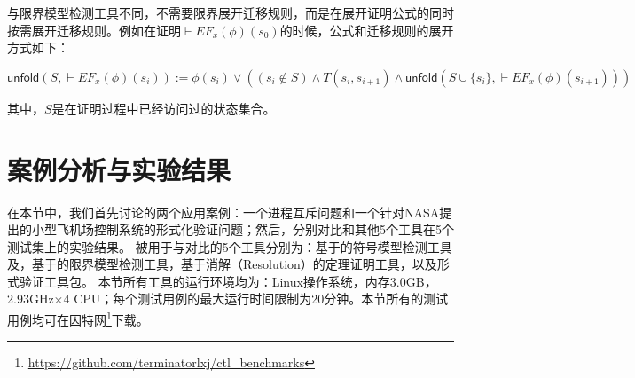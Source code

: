 与限界模型检测工具不同，\sctlprov{}不需要限界展开迁移规则，而是在展开证明公式的同时按需展开迁移规则。例如在证明$\vdash EF_x(\phi)(s_0)$的时候，公式和迁移规则的展开方式如下：

\begin{center}{\small
		$
		\textsf{unfold}(S,\vdash EF_x(\phi)(s_i)) := 
		\phi(s_i) \vee ((s_i\notin S) \wedge T(s_i, s_{i+1}) \wedge 
		\textsf{unfold}(S\cup \{s_i\},\vdash EF_x(\phi)(s_{i+1})))
		$
	}
\end{center}
其中，$S$是在证明过程中已经访问过的状态集合。




\section{案例分析与实验结果}\label{sec:case_exp}

在本节中，我们首先讨论\sctlprov{}的两个应用案例：一个进程互斥问题和一个针对NASA提出的小型飞机场控制系统的形式化验证问题；然后，分别对比\sctlprov{}和其他5个工具在5个测试集上的实验结果。
被用于与\sctlprov{}对比的5个工具分别为：基于\BDD{}的符号模型检测工具\nusmv{}及\nuxmv，基于\QBF{}的限界模型检测工具\verds{}，基于消解（Resolution）的定理证明工具，以及形式验证工具包\CADP{}。
本节所有工具的运行环境均为：Linux操作系统，内存3.0GB，2.93GHz$\times$4 CPU；每个测试用例的最大运行时间限制为20分钟。本节所有的测试用例均可在因特网\footnote{\url{https://github.com/terminatorlxj/ctl_benchmarks}}下载。


